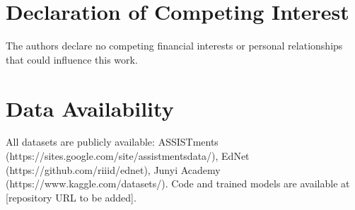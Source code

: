 \documentclass[preprint,12pt]{elsarticle}
\begin{document}
\section*{Declaration of Competing Interest}

The authors declare no competing financial interests or personal relationships that could influence this work.

\section*{Data Availability}

All datasets are publicly available: ASSISTments (https://sites.google.com/site/assistmentsdata/), EdNet (https://github.com/riiid/ednet), Junyi Academy (https://www.kaggle.com/datasets/). Code and trained models are available at [repository URL to be added].
\end{document}
